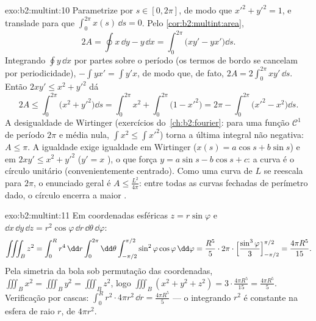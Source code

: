 \begin{solution}{exo:b2:multint:10}
Parametrize por  $s \in [0, 2\pi]$, de modo que $x'^2 + y'^2 = 1$,
e translade para que $\int_0^{2\pi} x(s)\,\dd s = 0$. Pelo
\cref{cor:b2:multint:area},
\[
2A = \oint x\,\dd y - y\,\dd x
= \int_0^{2\pi}\bigl(xy' - yx'\bigr)\dd s .
\]
Integrando $\oint y\,\dd x$ por partes sobre o período (os termos de
bordo se cancelam por periodicidade), $-\int yx' = \int y'x$, de modo que, de fato,
$2A = 2\int_0^{2\pi}xy'\,\dd s$. Então $2xy' \leq x^2 + y'^2$
dá
\[
2A \leq \int_0^{2\pi}\bigl(x^2 + y'^2\bigr)\dd s
= \int_0^{2\pi} x^2 + \int_0^{2\pi}\bigl(1 - x'^2\bigr)
= 2\pi - \int_0^{2\pi}\bigl(x'^2 - x^2\bigr)\dd s .
\]
A desigualdade de Wirtinger (exercícios do~\cref{ch:b2:fourier}: para uma
função $\mathcal{C}^1$ de período $2\pi$ e média nula,
$\int x^2 \leq \int x'^2$) torna a última integral não negativa:
$A \leq \pi$. A igualdade exige igualdade em Wirtinger ($x(s) =
a\cos s + b\sin s$) e em $2xy' \leq x^2 + y'^2$ ($y' = x$
), o que força $y = a\sin s - b\cos s + c$: a curva é
o círculo unitário (convenientemente centrado). Como uma curva de  $L$
se reescala para  $2\pi$, o enunciado geral é $A \leq
\frac{L^2}{4\pi}$: entre todas as curvas fechadas de perímetro dado, o
círculo encerra a maior .
\end{solution}

\begin{solution}{exo:b2:multint:11}
Em coordenadas esféricas $z = r\sin\varphi$ e $\dd x\,\dd
y\,\dd z = r^2\cos\varphi\,\dd r\,\dd\theta\,\dd\varphi$:
\[
\iiint_B z^2
= \int_0^R r^4\,\dd r\int_0^{2\pi}\dd\theta
\int_{-\pi/2}^{\pi/2}\sin^2\varphi\cos\varphi\,\dd\varphi
= \frac{R^5}5\cdot2\pi\cdot
\Bigl[\frac{\sin^3\varphi}3\Bigr]_{-\pi/2}^{\pi/2}
= \frac{4\pi R^5}{15}.
\]
Pela simetria da bola sob permutação das coordenadas,
$\iiint_B x^2 = \iiint_B y^2 = \iiint_B z^2$, logo $\iiint_B(x^2
+ y^2 + z^2) = 3\cdot\frac{4\pi R^5}{15} = \frac{4\pi R^5}5$.
Verificação por cascas: $\int_0^R r^2\cdot 4\pi r^2\,\dd r = \frac{4\pi
R^5}5$ --- o integrando $r^2$ é constante na esfera de
raio $r$, de  $4\pi r^2$.
\end{solution}

